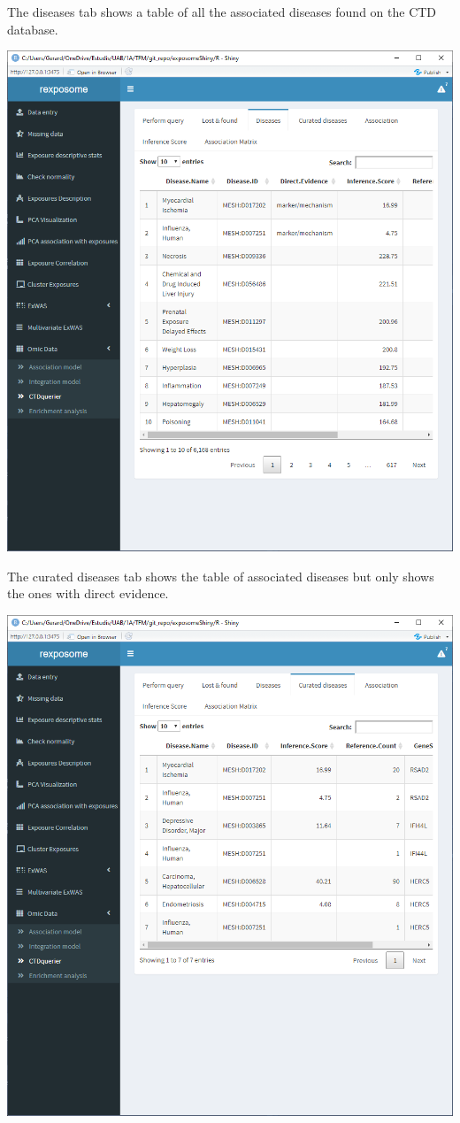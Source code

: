 \documentclass[
]{book}
\begin{document}
The diseases tab shows a table of all the associated diseases found on the CTD database.

\includegraphics{images/analysis10_5.png}

The curated diseases tab shows the table of associated diseases but only shows the ones with direct evidence.

\includegraphics{images/analysis10_6.png}
\end{document}
